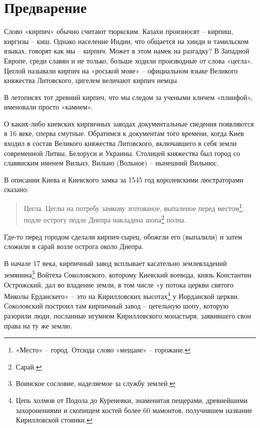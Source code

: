\chapter*{Предварение}

Слово «кирпич» обычно считают тюркским. Казахи произносят – кирпиш, киргизы – киш. Однако население Индии, что общается на хинди и тамильском языках, говорят как мы – кирпич. Может в этом намек на разгадку? В Западной Европе, среди славян и не только, больше ходили производные от слова «цегла». Цеглой называли кирпич на «роськой мове» – официальном языке Великого княжества Литовского, цигелем величают кирпич немцы.

В летописях тот древний кирпич, что мы следом за учеными кличем «плинфой», именовали просто «камнем». 

О каких-либо киевских кирпичных заводах документальные сведения появляются в 16 веке, сперва смутные. Обратимся к документам того времени, когда Киев входил в состав Великого княжества Литовского, включавшего в себя земли современной Литвы, Белоруси и Украины. Столицей княжества был город со славянским именем Вильнэ, Вильно (Вольное) – нынешний Вильнюс.
 
В описании Киева и Киевского замка за 1545 год королевскими люстраторами сказано\cite{sbornikmat}:

\begin{quotation}
Цегла. Цеглы на потребу замкову зготованое, выпаленое перед местом\footnote{«Место» – город. Отсюда слово «мещане» – горожане.}, подле острогу подле Днепра накладена шопа\footnote{Сарай.} полна.
\end{quotation}

Где-то перед городом сделали кирпич-сырец, обожгли его (выпалили) и затем сложили в сарай возле острога около Днепра.

В начале 17 века, кирпичный завод всплывает касательно землевладений земянина\footnote{Воинское сословие, наделяемое за службу землей.} Войтеха Соколовского, которому Киевский воевода, князь Константин Острожский, дал во владение земли, в том числе «у потока церкви святого Миколы Ерданскего» – это на Кирилловских высотах\footnote{Цепь холмов от Подола до Куреневки, знаменитая пещерами, древнейшими захоронениями и скопищем костей более 60 мамонтов, получившем название Кирилловской стоянки.} у Иорданской церкви. Соколовский построил там кирпичный завод – цегельную шопу, которую разорили люди, посланные игумном Кирилловского монастыря, заявившего свои права на ту же землю. 

